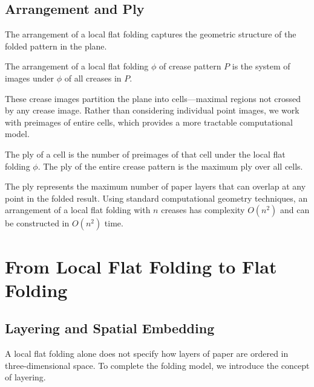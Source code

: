 \subsection{Arrangement and Ply}

The arrangement of a local flat folding captures the geometric structure of the folded pattern in the plane.

\begin{definition}[Arrangement]
The arrangement of a local flat folding $\phi$ of crease pattern $P$ is the system of images under $\phi$ of all creases in $P$.
\end{definition}

These crease images partition the plane into cells---maximal regions not crossed by any crease image. Rather than considering individual point images, we work with preimages of entire cells, which provides a more tractable computational model.

\begin{definition}[Ply]
The ply of a cell is the number of preimages of that cell under the local flat folding $\phi$. The ply of the entire crease pattern is the maximum ply over all cells.
\end{definition}

The ply represents the maximum number of paper layers that can overlap at any point in the folded result. Using standard computational geometry techniques, an arrangement of a local flat folding with $n$ creases has complexity $O(n^2)$ and can be constructed in $O(n^2)$ time.

\section{From Local Flat Folding to Flat Folding}

\subsection{Layering and Spatial Embedding}

A local flat folding alone does not specify how layers of paper are ordered in three-dimensional space. To complete the folding model, we introduce the concept of layering.

